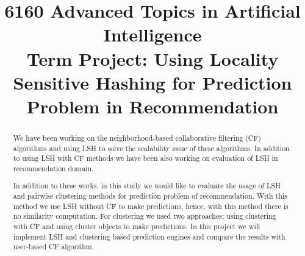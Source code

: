 \documentclass[conference]{IEEEtran}
\begin{document}
%
\title {6160 Advanced Topics in Artificial Intelligence \\Term Project: Using Locality Sensitive Hashing for Prediction Problem in Recommendation}

\author{
 }



% 




\maketitle


\begin{abstract}

We have been working on the neighborhood-based collaborative filtering (CF) 
algorithms and using LSH to solve the scalability issue of these algorithms. 
In addition to using LSH with CF methods we have been also working on 
evaluation of LSH in recommendation domain.

In addition to these works, in this study we would like to evaluate the usage 
of  LSH and pairwise clustering methods for prediction problem of recommendation. 
With this method we use LSH without CF to make predictions, hence, with this 
method there is no similarity computation. For clustering we used two 
approaches; using clustering with CF and using cluster objects to make 
predictions. In this project we will implement LSH and clustering based prediction 
engines and compare the results with user-based CF algorithm.

\end{abstract}


\end{document}
